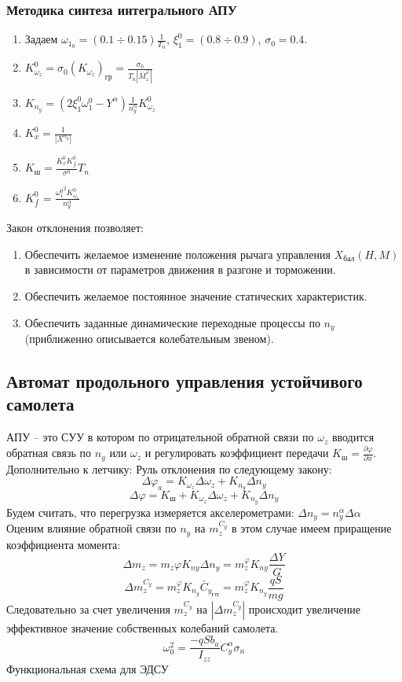 \documentclass{article}
\begin{document}
\subsubsection{Методика синтеза интегрального АПУ}
\begin{enumerate}
    \item Задаем $\omega_{{1}_{0}} = (0.1 \div 0.15) \frac{1}{T_n}$, $\xi_1^0 =
        (0.8 \div 0.9)$, $\sigma_0 = 0.4$.
    \item $K_{\omega_z}^0 = \sigma_0 (K_{\omega_z})_\text{гр} =
        \frac{\sigma_0}{T_n|\bar{M}_z^\varphi|}$
    \item $K_{n_y} = (2\xi_1^0 \omega_1^0 - Y^\alpha)\frac{1}{n_y^\alpha}
        K_{\omega_z}^0$
    \item $K_x^0 = \frac{1}{|X^{n_y}|}$
    \item $K_\text{ш} = \frac{K_x^0 K_{\int}^0}{\sigma^0}T_n$
    \item $K_{\int}^0 = \frac{{\omega_1^0}^2 K_{\omega_z}^0}{n_y^\alpha}$
\end{enumerate}
Закон отклонения позволяет:
\begin{enumerate}
    \item Обеспечить желаемое изменение положения рычага управления
        $X_\text{бал}(H,M)$ в зависимости от параметров движения в разгоне и
        торможении.
    \item Обеспечить желаемое постоянное значение статических характеристик.
    \item Обеспечить заданные динамические переходные процессы по $n_y$
        (приближенно описывается колебательным звеном).
\end{enumerate}
\subsection{Автомат продольного управления устойчивого самолета}
АПУ -- это СУУ в котором по отрицательной обратной связи по $\omega_z$ вводится
обратная связь по $n_y$ или $\omega_z$ и регулировать коэффициент передачи
$K_\text{ш}=\frac{\partial \varphi}{\partial x}$.\\
Дополнительно к летчику:
Руль отклонения по следующему закону:
\[
    \Delta \varphi_a  = K_{\omega_z} \Delta \omega_z + K_{n_y} \Delta n_y
\]
\[
    \Delta \varphi = K_\text{ш} + K_{\omega_z}\Delta \omega_z + K_{n_y} \Delta
    n_y
\]
Будем считать, что перегрузка измеряется акселерометрами: $\Delta n_y =
n_y^\alpha \Delta \alpha$
Оценим влияние обратной связи по $n_y$ на $m_z^{C_y}$ в этом случае имеем
приращение коэффициента момента:
\[
    \Delta m_z = m_z \varphi K_{ny}\Delta n_y = m_z^\varphi K_{ny} \frac{\Delta
    Y}{G}
\]
\[
    \Delta m_z^{C_y} = m_z^\varphi K_{n_y} \bar{C}_{y_\text{ГП}} = m_z^\varphi
    K_{n_y} \frac{qS}{mg}
\]
Следовательно за счет увеличения $m_z^{C_y}$ на $|\Delta m_z^{C_y}|$ происходит
увеличение эффективное значение собственных колебаний самолета.
\[
    \omega_0^2 = \frac{-qS b_a}{I_{zz}} C_y^\alpha \sigma_n
\]
Функциональная схема для ЭДСУ
\end{document}
